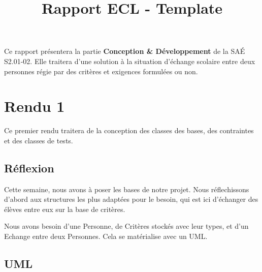 \documentclass{mytex}
\title{Rapport ECL - Template} %
\begin{document}




        
\fairemarges %
\fairepagedegarde %
\tabledematieres %



Ce rapport présentera la partie \textbf{Conception \& Développement} de la SAÉ S2.01-02. Elle traitera d'une solution à la situation d'échange scolaire entre deux personnes régie par des critères et exigences formulées ou non.

\section{Rendu 1}

Ce premier rendu traitera de la conception des classes des bases, des contraintes et des classes de tests.

\subsection{Réflexion}

Cette semaine, nous avons à poser les bases de notre projet.
Nous réflechissons d'abord aux structures les plus adaptées pour le besoin, qui est ici d'échanger des élèves entre eux sur la base de critères.

Nous avons besoin d'une Personne, de Critères stockés avec leur types, et d'un Echange entre deux Personnes.
Cela se matérialise avec un UML.

\subsection{UML}

\end{document}
